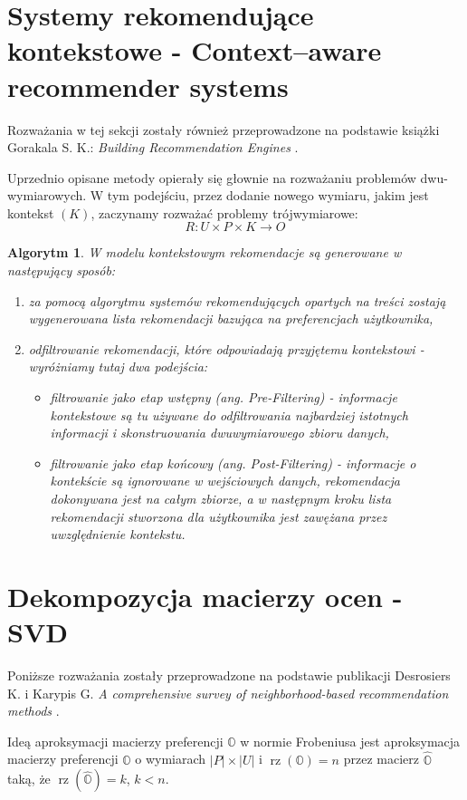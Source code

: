 \documentclass[12pt,a4paper]{report}
\newtheorem{algorytm}[df]{Algorytm}
\newcommand{\setUzytkownicy}{\mathit{U}}
\newcommand{\setPrzedmioty}{\mathit{P}}
\newcommand{\setOceny}{\mathit{O}}
\newcommand{\setKontekst}{\mathit{K}}
\newcommand{\rz}[1]{\operatorname{rz}\left({#1} \right)}
\begin{document}
\section{Systemy rekomendujące kontekstowe - Context–aware recommender systems}
Rozważania w tej sekcji zostały również przeprowadzone na podstawie książki Gorakala S. K.: \textit{Building Recommendation Engines} {\citep[Sec 3]{bre}}.
\bigskip

Uprzednio opisane metody opierały się głownie na rozważaniu problemów dwu-wymiarowych. W tym podejściu, przez dodanie nowego wymiaru, jakim jest kontekst $(K)$, zaczynamy rozważać problemy trójwymiarowe:
$$
R: \setUzytkownicy \times \setPrzedmioty \times \setKontekst  \rightarrow \setOceny
$$

\begin{algorytm}
W modelu kontekstowym rekomendacje są generowane w następujący sposób:
\begin{enumerate}
\item za pomocą algorytmu systemów rekomendujących opartych na treści zostają wygenerowana lista rekomendacji bazująca na  preferencjach użytkownika,
\item odfiltrowanie rekomendacji, które odpowiadają przyjętemu kontekstowi - 
wyróżniamy tutaj dwa podejścia:
\begin{itemize}
\item filtrowanie jako etap wstępny (ang. Pre-Filtering) - informacje kontekstowe są tu używane do odfiltrowania najbardziej istotnych informacji i skonstruowania dwuwymiarowego zbioru danych,
\item filtrowanie jako etap końcowy (ang. Post-Filtering) - informacje o kontekście są ignorowane w wejściowych danych, rekomendacja dokonywana jest na całym zbiorze, a w następnym kroku lista rekomendacji stworzona dla użytkownika jest zawężana przez uwzględnienie kontekstu.
\end{itemize}
\end{enumerate}
\end{algorytm}

\section{Dekompozycja macierzy ocen - SVD}
Poniższe rozważania zostały przeprowadzone na podstawie publikacji Desrosiers K. i Karypis G. \textit{A comprehensive survey of neighborhood-based recommendation methods} {\citep[Sec 4.1.1]{acsonbrs}}.

Ideą aproksymacji macierzy preferencji $\mathbb{O}$ w normie Frobeniusa jest aproksymacja macierzy preferencji $\mathbb{O}$ o wymiarach $|\mathit{P}| \times |\mathit{U}|$ i $\rz{\mathbb{O}} = n$ przez macierz $\widehat{\mathbb{O}}$ taką, że $\rz{\widehat{\mathbb{O}}} = k$, $k<n$. 
\end{document}

